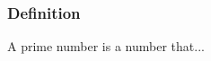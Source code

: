 \begin{frame}\frametitle{Definition}

\begin{definition}
A prime number is a number that...
\end{definition}

\end{frame}